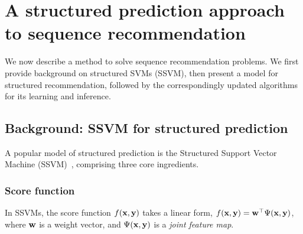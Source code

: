 \section{A structured prediction approach to sequence recommendation}
\label{sec:recseq}

We now describe a method to
solve sequence recommendation problems.
We first provide background on structured SVMs (SSVM), %
then present a model for structured recommendation, %
followed by the correspondingly updated algorithms for its learning %
and inference. %


\subsection{Background: SSVM for structured prediction}
\label{ssec:ssvm}

A popular model of structured prediction is the Structured Support Vector Machine (SSVM)~\cite{taskar2004max,tsochantaridis2004support}, comprising three core ingredients.

\subsubsection{Score function}
In SSVMs, %
the score function $f(\mathbf{x}, \mathbf{y})$ takes a linear form, \ie
$f(\mathbf{x}, \mathbf{y}) = \mathbf{w}^\top \Psi(\mathbf{x}, \mathbf{y})$,
where $\mathbf{w}$ is a weight vector, and $\Psi(\mathbf{x}, \mathbf{y})$ is a \emph{joint feature map}.

